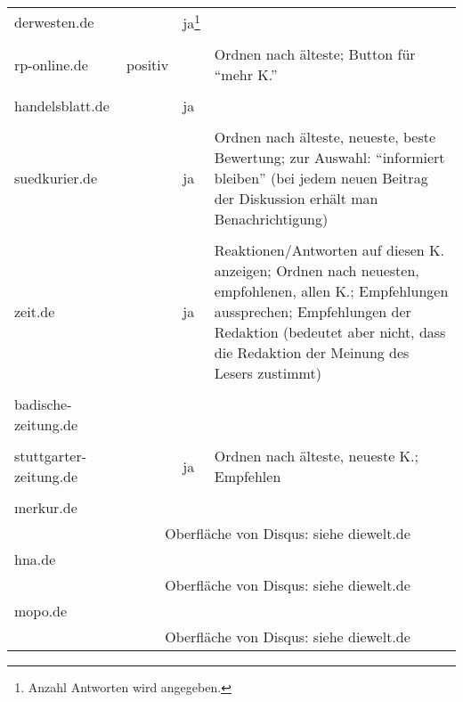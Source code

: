 \begin{landscape}
\begin{longtable}{l|p{40mm}p{40mm}p{80mm}}
  derwesten.de & & ja\footnote{Anzahl Antworten wird angegeben.} & \\
               & \multicolumn{3}{c}{}\\\hline

  rp-online.de & positiv & & Ordnen nach älteste; Button für ``mehr K.''\\
            & \multicolumn{3}{c}{}\\\hline

  handelsblatt.de & & ja & \\
               & \multicolumn{3}{c}{}\\\hline

  suedkurier.de & & ja &
    Ordnen nach älteste, neueste, beste Bewertung; zur Auswahl: ``informiert
    bleiben'' (bei jedem neuen Beitrag der Diskussion erhält man
    Benachrichtigung)\\
    & \multicolumn{3}{c}{}\\\hline

  zeit.de & & ja &
    Reaktionen/Antworten auf diesen K. anzeigen; Ordnen nach neuesten,
    empfohlenen, allen K.; Empfehlungen aussprechen; Empfehlungen der Redaktion
    (bedeutet aber nicht, dass die Redaktion der Meinung des Lesers zustimmt)\\
    & \multicolumn{3}{c}{}\\\hline

  badische-zeitung.de & & & \\
                   & \multicolumn{3}{c}{} \\\hline

  stuttgarter-zeitung.de & & ja & Ordnen nach älteste, neueste K.; Empfehlen\\
                      & \multicolumn{3}{c}{}\\\hline

  merkur.de &  & & \\
         & \multicolumn{3}{c}{Oberfläche von Disqus: siehe diewelt.de}\\\hline


  hna.de & & & \\
      & \multicolumn{3}{c}{Oberfläche von Disqus: siehe diewelt.de}\\\hline

  mopo.de & & & \\
         & \multicolumn{3}{c}{Oberfläche von Disqus: siehe diewelt.de}\\\hline


\end{longtable}
\end{landscape}
